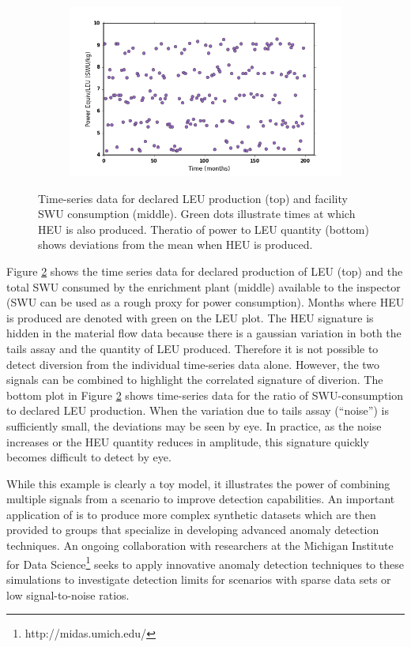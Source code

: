 \begin{figure}
\begin{subfigure}{0.6\textwidth}
            \includegraphics[natwidth=162bp,natheight=227bp, scale=0.6]{./figs/mm_5enrich_tinytails_inspratio_swu_leu.png}
            \label{fig:ratio}
    \end{subfigure}
    \caption{Time-series data for declared LEU production (top) and facility SWU consumption (middle). Green dots illustrate times at which HEU is also produced.  Theratio of power to LEU quantity (bottom) shows deviations from the mean when HEU is produced.}
    \label{fig:time_series}
\end{figure}


Figure \ref{fig:time_series} shows the time series data for declared production of \gls{LEU} (top) and the total \gls{SWU} consumed by the enrichment plant (middle) available to the inspector (\gls{SWU} can be used as a rough proxy for power consumption).  Months where \gls{HEU} is produced are denoted with green on the \gls{LEU} plot.  The \gls{HEU} signature is hidden in the material flow data because there is a gaussian variation in both the tails assay and the quantity of LEU produced.  Therefore it is not possible to detect diversion from the individual time-series data alone. However, the two signals can be combined to highlight the correlated signature of diverion. The bottom plot in Figure \ref{fig:time_series} shows time-series data for the ratio of SWU-consumption to declared \gls{LEU} production.  When the variation due to tails assay (``noise'') is sufficiently small, the deviations may be seen by eye. In practice, as the noise increases or the \gls{HEU} quantity reduces in amplitude, this signature quickly becomes difficult to detect by eye.

While this example is clearly a toy model, it illustrates the power of combining multiple signals from a scenario to improve detection capabilities. An important application of \Cyclus is to produce more complex synthetic datasets which are then provided to groups that specialize in developing advanced anomaly detection techniques. An ongoing collaboration with researchers at the Michigan Institute for Data Science\footnote{http://midas.umich.edu/} seeks to apply innovative anomaly detection techniques to these simulations to investigate detection limits for scenarios with sparse data sets or low signal-to-noise ratios.


